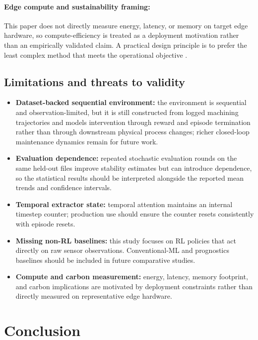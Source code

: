 \documentclass[sn-basic]{sn-jnl} %
\begin{document}
\paragraph{Edge compute and sustainability framing:}
This paper does not directly measure energy, latency, or memory on target edge hardware, so compute-efficiency is treated as a deployment motivation rather than an empirically validated claim. A practical design principle is to prefer the least complex method that meets the operational objective \cite{Schwartz2020, Strubell2019}.

\subsection{Limitations and threats to validity}
\begin{itemize}
	\item \textbf{Dataset-backed sequential environment:} the environment is sequential and observation-limited, but it is still constructed from logged machining trajectories and models intervention through reward and episode termination rather than through downstream physical process changes; richer closed-loop maintenance dynamics remain for future work.
	\item \textbf{Evaluation dependence:} repeated stochastic evaluation rounds on the same held-out files improve stability estimates but can introduce dependence, so the statistical results should be interpreted alongside the reported mean trends and confidence intervals.
	\item \textbf{Temporal extractor state:} temporal attention maintains an internal timestep counter; production use should ensure the counter resets consistently with episode resets.
	\item \textbf{Missing non-RL baselines:} this study focuses on RL policies that act directly on raw sensor observations. Conventional-ML and prognostics baselines should be included in future comparative studies.
	\item \textbf{Compute and carbon measurement:} energy, latency, memory footprint, and carbon implications are motivated by deployment constraints rather than directly measured on representative edge hardware.
\end{itemize}

\section{Conclusion}
\label{sec:conclusion}
\end{document}
